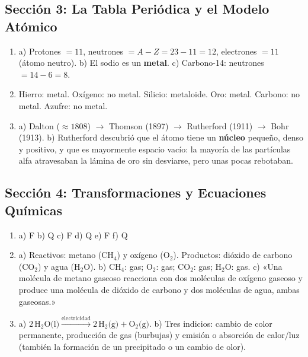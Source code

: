 \documentclass[12pt, letterpaper]{article}
\begin{document}
  \newpage

  \subsection*{Sección 3: La Tabla Periódica y el Modelo Atómico}

  \begin{enumerate}[leftmargin=*, label=\textbf{\arabic*.}]
    \item a) Protones $= 11$, neutrones $= A - Z = 23 - 11 = 12$, electrones $= 11$ (átomo neutro).
          \quad b) El sodio es un \textbf{metal}.
          \quad c) Carbono-14: neutrones $= 14 - 6 = 8$.

    \item Hierro: metal. \quad Oxígeno: no metal. \quad Silicio: metaloide. \quad Oro: metal. \quad Carbono: no metal. \quad Azufre: no metal.

    \item a) Dalton ($\approx 1808$) $\rightarrow$ Thomson (1897) $\rightarrow$ Rutherford (1911) $\rightarrow$ Bohr (1913).
          \quad b) Rutherford descubrió que el átomo tiene un \textbf{núcleo} pequeño, denso y positivo, y que es mayormente espacio vacío: la mayoría de las partículas alfa atravesaban la lámina de oro sin desviarse, pero unas pocas rebotaban.
  \end{enumerate}

  \newpage

  \subsection*{Sección 4: Transformaciones y Ecuaciones Químicas}

  \begin{enumerate}[leftmargin=*, label=\textbf{\arabic*.}]
    \item a) F \quad b) Q \quad c) F \quad d) Q \quad e) F \quad f) Q

    \item a) Reactivos: metano (CH$_4$) y oxígeno (O$_2$). Productos: dióxido de carbono (CO$_2$) y agua (H$_2$O).
          \quad b) CH$_4$: gas; O$_2$: gas; CO$_2$: gas; H$_2$O: gas.
          \quad c) «Una molécula de metano gaseoso reacciona con dos moléculas de oxígeno gaseoso y produce una molécula de dióxido de carbono y dos moléculas de agua, ambas gaseosas.»

    \item a) $2\,\text{H}_2\text{O(l)} \xrightarrow{\text{electricidad}} 2\,\text{H}_2\text{(g)} + \text{O}_2\text{(g)}$.
          \quad b) Tres indicios: cambio de color permanente, producción de gas (burbujas) y emisión o absorción de calor/luz (también la formación de un precipitado o un cambio de olor).
  \end{enumerate}

\fi
\end{document}
